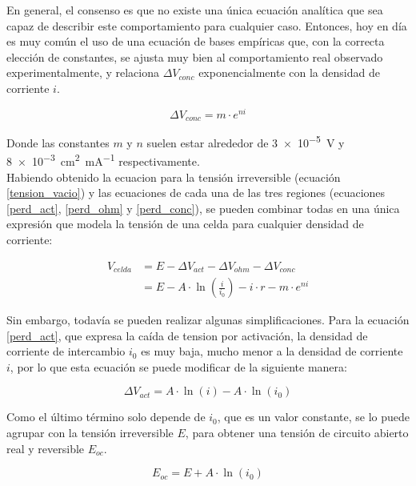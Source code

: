 En general, el consenso es que no existe una única ecuación analítica que sea capaz de describir este comportamiento para cualquier caso. Entonces, hoy en día es muy común el uso de una ecuación de bases empíricas que, con la correcta elección de constantes, se ajusta muy bien al comportamiento real observado experimentalmente, y relaciona $\Delta V_{conc}$  exponencialmente con la densidad de corriente $i$.

\begin{equation}\label{perd_conc}
    \Delta V_{conc}=m\cdot e^{ni}
\end{equation}

Donde las constantes $m$ y $n$ suelen estar alrededor de \SI{3e-5}{\volt} y \SI{8e-3}{\cm\squared\per\milli\ampere} respectivamente.\\

Habiendo obtenido la ecuacion para la tensión irreversible (ecuación \ref{tension_vacio}) y las ecuaciones de cada una de las tres regiones (ecuaciones \ref{perd_act}, \ref{perd_ohm} y \ref{perd_conc}), se pueden combinar todas en una única expresión que modela la tensión de una celda para cualquier densidad de corriente:

\begin{equation}
    \begin{aligned}
        V_{celda} & = E - \Delta V_{act} - \Delta V_{ohm} - \Delta V_{conc}\\
                  & = E - A\cdot \ln\left(\frac{i}{i_0}\right) - i\cdot r - m\cdot e^{ni}
    \end{aligned}
\end{equation}

Sin embargo, todavía se pueden realizar algunas simplificaciones. Para la ecuación \ref{perd_act}, que expresa la caída de tension por activación, la densidad de corriente de intercambio $i_0$ es muy baja, mucho menor a la densidad de corriente $i$, por lo que esta ecuación se puede modificar de la siguiente manera:

\begin{equation*}
    \Delta V_{act} = A\cdot \ln(i) - A\cdot \ln(i_0)
\end{equation*}

Como el último término solo depende de $i_0$, que es un valor constante, se lo puede agrupar con la tensión irreversible $E$, para obtener una tensión de circuito abierto real y reversible $E_{oc}$.

\begin{equation}
    E_{oc} = E + A\cdot\ln(i_0)
\end{equation}

